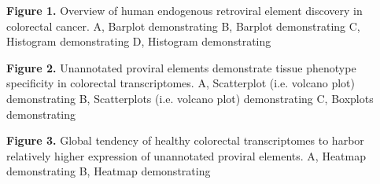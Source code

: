 \textbf{Figure 1.} Overview of human endogenous retroviral element discovery in colorectal cancer.
A, Barplot demonstrating
B, Barplot demonstrating
C, Histogram demonstrating
D, Histogram demonstrating

\textbf{Figure 2.} Unannotated proviral elements demonstrate tissue phenotype specificity in colorectal transcriptomes.
A, Scatterplot (i.e. volcano plot) demonstrating
B, Scatterplots (i.e. volcano plot) demonstrating
C, Boxplots demonstrating

\textbf{Figure 3.} Global tendency of healthy colorectal transcriptomes to harbor relatively higher expression of unannotated proviral elements.
A, Heatmap demonstrating
B, Heatmap demonstrating

